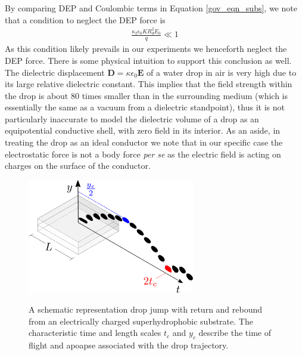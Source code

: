\documentclass[12pt,a4paper,oneside]{book}
\begin{document}
By comparing DEP and Coulombic terms in Equation \ref{gov_eqn_subs}, we note that a condition to neglect the DEP force is
\begin{eqnarray}
\frac{ \kappa_2 \epsilon_0 K R_d^2 E_0}{q} \ll 1 \nonumber
\end{eqnarray}
As this condition likely prevails in our experiments we henceforth neglect the DEP force. There is some physical intuition to support this conclusion as well. The dielectric displacement $\mathbf{D} = \kappa \epsilon_0 \mathbf{E}$ of a water drop in air is very high due to its large relative dielectric constant. This implies that the field strength within the drop is about 80 times smaller than in the surrounding medium (which is essentially the same as a vacuum from a dielectric standpoint), thus it is not particularly inaccurate to model the dielectric volume of a drop as an equipotential conductive shell, with zero field in its interior. As an aside, in treating the drop as an ideal conductor we note that in our specific case the electrostatic force is not a body force \emph{per se} as the electric field is acting on charges on the surface of the conductor.
\begin{figure}[ht]
\centering
\includegraphics[width=0.65\textwidth]{../figures/apparatus0.pdf}
\label{apparatus}
\caption{A schematic representation drop jump with return and rebound from an electrically charged superhydrophobic substrate. The characteristic time and length scales $t_c$ and $y_c$ describe the time of flight and apoapse associated with the drop trajectory.}
\end{figure}
\end{document}
